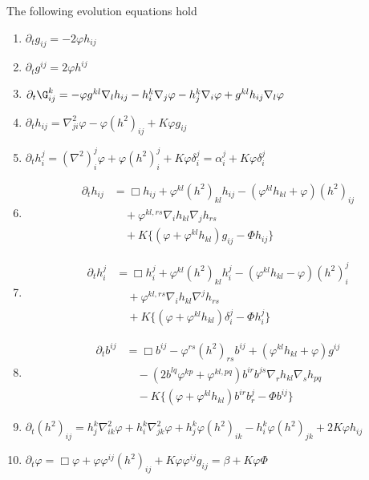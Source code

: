 \documentclass[12pt]{amsart}
\begin{document}
\begin{lemma}
\label{lem:evolution}
The following evolution equations hold
\begin{enumerate}
\item \label{eq:delt_metric} $\partial_tg_{ij} = -2\varphi h_{ij}$
\item \label{eq:delt_inversemetric} $\partial_t g^{ij} = 2\varphi h^{ij}$
\item \label{eq:delt_christoffel} $\partial_t {\G}^{k}_{ij} = -\varphi g^{kl} \nabla_l h_{ij} - h^k_i \nabla_j \varphi - h^k_j \nabla_i \varphi + g^{kl} h_{ij} \nabla_l \varphi$
\item \label{eq:delt_sff} $\partial_t h_{ij} = \nabla^2_{ji} \varphi - \varphi(h^2)_{ij} + K \varphi g_{ij}$
\item \label{eq:delt_weingarten} $\partial_t h_i^j = (\nabla^2)^j_i\varphi + \varphi(h^2)_i^j + K \varphi\delta_i^j = \alpha^j_i + K \varphi\delta_i^j$
\item \label{eq:delt_sff_box} \begin{align*}
\partial_t h_{ij} &= \Box h_{ij} + \varphi^{kl} (h^2)_{kl} h_{ij} - (\varphi^{kl}h_{kl} + \varphi) (h^2)_{ij} \\
& \quad + \varphi^{kl,rs}\nabla_i h_{kl}\nabla_j h_{rs} \\
& \quad + K \{(\varphi + \varphi^{kl}h_{kl}) g_{ij} - \Phi h_{ij}\}
\end{align*}
\item \label{eq:delt_weingarten_box} \begin{align*}
\partial_t h_i^j &= \Box h_i^j + \varphi^{kl} (h^2)_{kl} h_i^j - (\varphi^{kl}h_{kl} - \varphi) (h^2)_i^j \\
& \quad + \varphi^{kl,rs}\nabla_i h_{kl}\nabla^j h_{rs} \\
& \quad + K \{(\varphi + \varphi^{kl}h_{kl}) \delta_i^j - \Phi h_i^j\}
\end{align*}
\item \label{eq:delt_inversesff} \begin{align*}
\partial_t b^{ij} &= \Box b^{ij} - \varphi^{rs} (h^2)_{rs} b^{ij} + (\varphi^{kl}h_{kl} + \varphi) g^{ij} \\
& \quad - \left(2b^{lq}\varphi^{kp} + \varphi^{kl,pq}\right) b^{ir}b^{js} \nabla_r h_{kl} \nabla_s h_{pq} \\
& \quad - K \{(\varphi + \varphi^{kl}h_{kl}) b^{ir}b^{j}_{r} - \Phi b^{ij}\}
\end{align*}
\item \label{eq:delt_squaredsff} $\partial_t (h^2)_{ij} = h^k_j \nabla^2_{ik} \varphi + h^k_i \nabla^2_{jk} \varphi + h^k_j \varphi(h^2)_{ik} - h^k_i \varphi(h^2)_{jk} + 2K\varphi h_{ij}$
\item \label{eq:delt_speed} $\partial_t \varphi = \Box \varphi + \varphi\varphi^{ij}(h^2)_{ij} + K \varphi\varphi^{ij}g_{ij} = \beta + K\varphi\Phi$
\end{enumerate}
\end{lemma}
\end{document}
